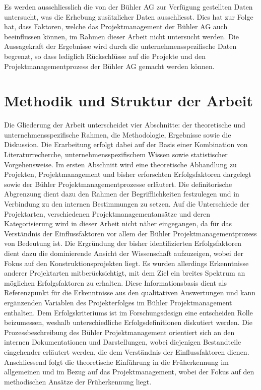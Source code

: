 \newline\newline
Es werden ausschliesslich die von der Bühler AG zur Verfügung gestellten Daten untersucht, was die Erhebung zusätzlicher Daten ausschliesst. Dies hat zur Folge hat, dass Faktoren, welche das Projektmanagement der Bühler AG auch beeinflussen können, im Rahmen dieser Arbeit nicht untersucht werden. Die Aussagekraft der Ergebnisse wird durch die unternehmensspezifische Daten begrenzt, so dass lediglich Rückschlüsse auf die Projekte und den Projektmanagementprozess der Bühler AG gemacht werden können.
\section{Methodik und Struktur der Arbeit}
Die Gliederung der Arbeit unterscheidet vier Abschnitte: der theoretische und unternehmensspezifische Rahmen, die Methodologie, Ergebnisse sowie die Diskussion. Die Erarbeitung erfolgt dabei auf der Basis einer Kombination von Literaturrecherche, unternehmensspezifischem Wissen sowie statistischer Vorgehensweise.
\newline\newline
Im ersten Abschnitt wird eine theoretische Abhandlung zu Projekten, Projektmanagement und bisher erforschten Erfolgsfaktoren dargelegt sowie der Bühler Projektmanagementprozesse erläutert. Die definitorische Abgrenzung dient dazu den Rahmen der Begrifflichkeiten festzulegen und in Verbindung zu den internen Bestimmungen zu setzen. Auf die Unterschiede der Projektarten, verschiedenen Projektmanagementansätze und deren Kategorisierung wird in dieser Arbeit nicht näher eingegangen, da für das Verständnis der Einflussfaktoren vor allem der Bühler Projektmanagementprozess von Bedeutung ist. Die Ergründung der bisher identifizierten Erfolgsfaktoren dient dazu die dominierende Ansicht der Wissenschaft aufzuzeigen, wobei der Fokus auf den Konstruktionsprojekten liegt. Es wurden allerdings Erkenntnisse anderer Projektarten mitberücksichtigt, mit dem Ziel ein breites Spektrum an möglichen Erfolgsfaktoren zu erhalten. Diese Informationsbasis dient als Referenzpunkt für die Erkenntnisse aus den qualitativen Auswertungen und kann ergänzenden Variablen des Projekterfolges im Bühler Projektmanagement enthalten. Dem Erfolgskriteriums ist im Forschungsdesign eine entscheiden Rolle beizumessen, weshalb unterschiedliche Erfolgsdefinitionen diskutiert werden. Die Prozessbeschreibung des Bühler Projektmanagement orientiert sich an den internen Dokumentationen und Darstellungen, wobei diejenigen Bestandteile eingehender erläutert werden, die dem Verständnis der Einflussfaktoren dienen. Anschliessend folgt die theoretische Einführung in die Früherkennung im allgemeinen und im Bezug auf das Projektmanagement, wobei der Fokus auf den methodischen Ansätze der Früherkennung liegt.
